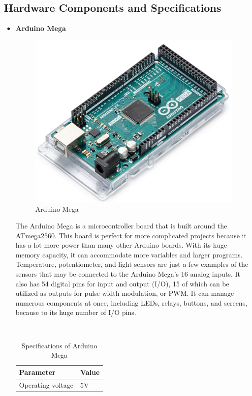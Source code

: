 \documentclass[12pt,a4paper]{report}
\begin{document}
\subsection {Hardware Components and Specifications}
\begin{itemize}
\item {\bf{Arduino Mega}}

\begin{figure}[H]
\begin{center}
\includegraphics[scale=0.35]{images/hardware/Arduinomega.png}
\caption{Arduino Mega}
\end{center}
\end{figure}

\par The Arduino Mega is a microcontroller board that is built around the ATmega2560. This board is perfect for more complicated projects because it has a lot more power than many other Arduino boards. With its huge memory capacity, it can accommodate more variables and larger programs. Temperature, potentiometer, and light sensors are just a few examples of the sensors that may be connected to the Arduino Mega's 16 analog inputs. It also has 54 digital pins for input and output (I/O), 15 of which can be utilized as outputs for pulse width modulation, or PWM. It can manage numerous components at once, including LEDs, relays, buttons, and screens, because to its huge number of I/O pins. 



\begin{table}[H]
\begin{center}
\caption{Specifications of Arduino Mega}%
\hspace*{0.2in}
\\
\begin{tabular}{| p{5cm} | p{5cm} |}
\hline
{\bf{Parameter}}             &{\bf{Value}}           \\ \hline
Operating voltage
& 5V \\ \hline


\end{tabular}
\end{center}
\end{table}
\end{itemize}
\end{document}
